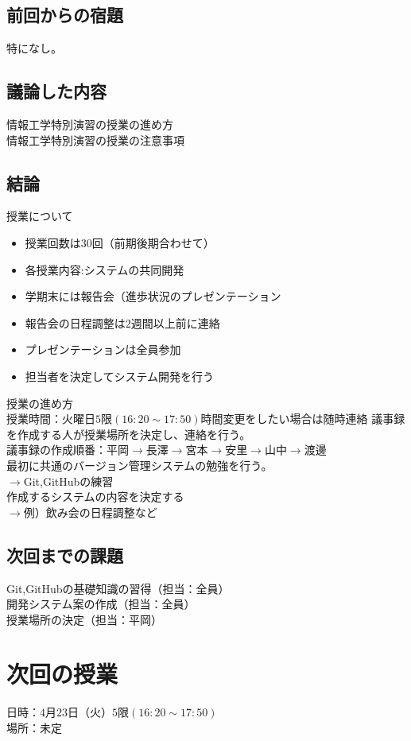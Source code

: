\subsection{前回からの宿題}
\noindent 特になし。
\subsection{議論した内容}
\noindent 情報工学特別演習の授業の進め方\\
情報工学特別演習の授業の注意事項
\subsection{結論}
授業について
\begin{itemize}
  \item 授業回数は$30$回（前期後期合わせて）
　\item 各授業内容:システムの共同開発
  \item 学期末には報告会（進歩状況のプレゼンテーション
  \item 報告会の日程調整は$2$週間以上前に連絡
  \item プレゼンテーションは全員参加
　\item 担当者を決定してシステム開発を行う
\end{itemize}

授業の進め方\\
授業時間：火曜日$5$限$(16:20 \sim 17:50)$時間変更をしたい場合は随時連絡
議事録を作成する人が授業場所を決定し、連絡を行う。\\
議事録の作成順番：平岡$\rightarrow$長澤$\rightarrow$宮本$\rightarrow$安里$\rightarrow$山中$\rightarrow$渡邊\\
最初に共通のバージョン管理システムの勉強を行う。\\
$\rightarrow$Git,GitHubの練習\\
作成するシステムの内容を決定する\\
$\rightarrow$例）飲み会の日程調整など\\

\subsection{次回までの課題}
\noindent Git,GitHubの基礎知識の習得（担当：全員）\\
開発システム案の作成（担当：全員）\\
授業場所の決定（担当：平岡）

\section{次回の授業}
\noindent 日時：$4$月$23$日（火）$5$限$(16:20 \sim 17:50)$\\
場所：未定

